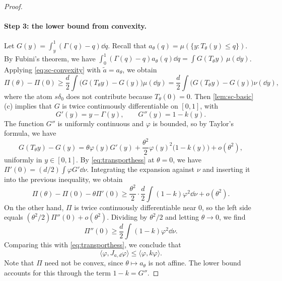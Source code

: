 \begin{proof}
\paragraph{Step 3: the lower bound from convexity.}
Let $G(y)=\int_y^1(\Gamma(q)-q)\dd q$. Recall that
$a_\theta(q)=\mu(\{y:T_\theta(y)\le q\})$. By Fubini's theorem, we have
$\int_0^1(\Gamma(q)-q)a_\theta(q)\dd q=\int G(T_\theta y)\,\mu(\dd y)$.
Applying \eqref{eq:sc-convexity} with $\widetilde a=a_\theta$, we obtain
\[
 \Pi(\theta)-\Pi(0)\ge\frac d2\int\bigl(G(T_\theta y)-G(y)\bigr)\mu(\dd y)
 =\frac d2\int\bigl(G(T_\theta y)-G(y)\bigr)\nu(\dd y),
\]
where the atom $s\delta_0$ does not contribute because $T_\theta(0)=0$.
Then \cref{lem:sc-basic}(c) implies that $G$ is twice continuously
differentiable on $[0,1]$, with
\[
 G'(y)=y-\Gamma(y),\qquad G''(y)=1-k(y).
\]
The function $G''$ is uniformly continuous and $\varphi$ is bounded, so
by Taylor's formula, we have
\[
 G(T_\theta y)-G(y)=\theta\varphi(y)G'(y)
 +\frac{\theta^2}2\varphi(y)^2\bigl(1-k(y)\bigr)+o(\theta^2),
\]
uniformly in $y\in[0,1]$. By \eqref{eq:transporthess} at $\theta=0$,
we have $\Pi'(0)=(d/2)\int\varphi G'\dd\nu$. Integrating the expansion
against $\nu$ and inserting it into the previous inequality, we obtain
\[
 \Pi(\theta)-\Pi(0)-\theta\Pi'(0)
 \ge\frac{\theta^2}2\cdot\frac d2\int(1-k)\varphi^2\dd\nu+o(\theta^2).
\]
On the other hand, $\Pi$ is twice continuously differentiable near
$0$, so the left side equals
$(\theta^2/2)\Pi''(0)+o(\theta^2)$. Dividing by $\theta^2/2$ and
letting $\theta\to0$, we find
\[
 \Pi''(0)\ge\frac d2\int(1-k)\varphi^2\dd\nu .
\]
Comparing this with
\eqref{eq:transporthess}, we conclude that
\begin{equation}\label{eq:sc-dom-smooth}
 \langle\varphi,J_{a,d}\varphi\rangle\le\langle\varphi,k\varphi\rangle .
\end{equation}
Note that $\Pi$ need not be convex, since $\theta\mapsto a_\theta$ is
not affine. The lower bound accounts for this through the term
$1-k=G''$.


\end{proof}

